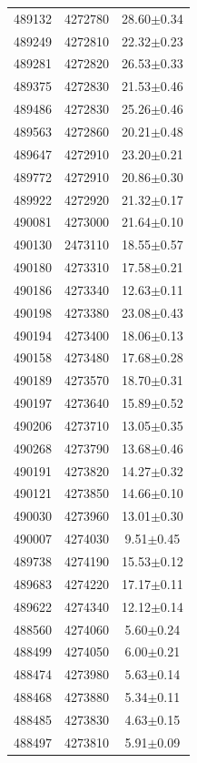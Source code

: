 \documentclass[12pt,letter]{article}
\begin{document}
\begin{center}
\begin{supertabular}{c c c}
489132	 & 	4272780	 & 	28.60$\pm$0.34\\ 
489249	 & 	4272810	 & 	22.32$\pm$0.23\\ 
489281	 & 	4272820	 & 	26.53$\pm$0.33\\ 
489375	 & 	4272830	 & 	21.53$\pm$0.46\\ 
489486	 & 	4272830	 & 	25.26$\pm$0.46\\ 
489563	 & 	4272860	 & 	20.21$\pm$0.48\\ 
489647	 & 	4272910	 & 	23.20$\pm$0.21\\ 
489772	 & 	4272910	 & 	20.86$\pm$0.30\\ 
489922	 & 	4272920	 & 	21.32$\pm$0.17\\ 
490081	 & 	4273000	 & 	21.64$\pm$0.10\\ 
490130	 & 	2473110	 & 	18.55$\pm$0.57\\ 
490180	 & 	4273310	 & 	17.58$\pm$0.21\\ 
490186	 & 	4273340	 & 	12.63$\pm$0.11\\ 
490198	 & 	4273380	 & 	23.08$\pm$0.43\\ 
490194	 & 	4273400	 & 	18.06$\pm$0.13\\ 
490158	 & 	4273480	 & 	17.68$\pm$0.28\\ 
490189	 & 	4273570	 & 	18.70$\pm$0.31\\ 
490197	 & 	4273640	 & 	15.89$\pm$0.52\\ 
490206	 & 	4273710	 & 	13.05$\pm$0.35\\ 
490268	 & 	4273790	 & 	13.68$\pm$0.46\\ 
490191	 & 	4273820	 & 	14.27$\pm$0.32\\ 
490121	 & 	4273850	 & 	14.66$\pm$0.10\\ 
490030	 & 	4273960	 & 	13.01$\pm$0.30\\ 
490007	 & 	4274030	 & 	9.51$\pm$0.45\\ 
489738	 & 	4274190	 & 	15.53$\pm$0.12\\ 
489683	 & 	4274220	 & 	17.17$\pm$0.11\\ 
489622	 & 	4274340	 & 	12.12$\pm$0.14\\ 
488560	 & 	4274060	 & 	5.60$\pm$0.24\\ 
488499	 & 	4274050	 & 	6.00$\pm$0.21\\ 
488474	 & 	4273980	 & 	5.63$\pm$0.14\\ 
488468	 & 	4273880	 & 	5.34$\pm$0.11\\ 
488485	 & 	4273830	 & 	4.63$\pm$0.15\\ 
488497	 & 	4273810	 & 	5.91$\pm$0.09\\ 

\end{supertabular}
\end{center}
\end{document}
